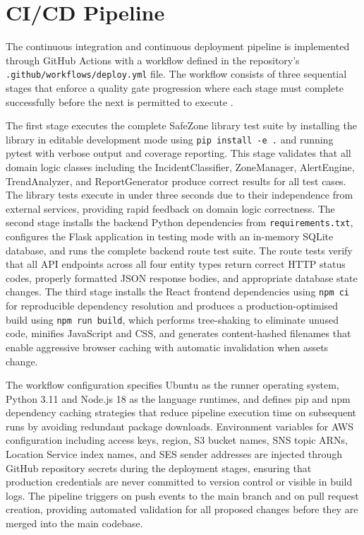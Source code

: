 \documentclass[conference]{IEEEtran}
\begin{document}
\section{CI/CD Pipeline}

The continuous integration and continuous deployment pipeline is implemented through GitHub Actions with a workflow defined in the repository's \texttt{.github/workflows/deploy.yml} file. The workflow consists of three sequential stages that enforce a quality gate progression where each stage must complete successfully before the next is permitted to execute \cite{humble2010continuous}.

The first stage executes the complete SafeZone library test suite by installing the library in editable development mode using \texttt{pip install -e .} and running pytest with verbose output and coverage reporting. This stage validates that all domain logic classes including the IncidentClassifier, ZoneManager, AlertEngine, TrendAnalyzer, and ReportGenerator produce correct results for all test cases. The library tests execute in under three seconds due to their independence from external services, providing rapid feedback on domain logic correctness. The second stage installs the backend Python dependencies from \texttt{requirements.txt}, configures the Flask application in testing mode with an in-memory SQLite database, and runs the complete backend route test suite. The route tests verify that all API endpoints across all four entity types return correct HTTP status codes, properly formatted JSON response bodies, and appropriate database state changes. The third stage installs the React frontend dependencies using \texttt{npm ci} for reproducible dependency resolution and produces a production-optimised build using \texttt{npm run build}, which performs tree-shaking to eliminate unused code, minifies JavaScript and CSS, and generates content-hashed filenames that enable aggressive browser caching with automatic invalidation when assets change.

The workflow configuration specifies Ubuntu as the runner operating system, Python 3.11 and Node.js 18 as the language runtimes, and defines pip and npm dependency caching strategies that reduce pipeline execution time on subsequent runs by avoiding redundant package downloads. Environment variables for AWS configuration including access keys, region, S3 bucket names, SNS topic ARNs, Location Service index names, and SES sender addresses are injected through GitHub repository secrets during the deployment stages, ensuring that production credentials are never committed to version control or visible in build logs. The pipeline triggers on push events to the main branch and on pull request creation, providing automated validation for all proposed changes before they are merged into the main codebase.
\end{document}
